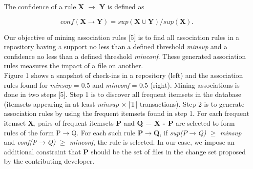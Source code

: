 The confidence of a rule \textbf{X} $\rightarrow$ \textbf{Y} is defined as 

\begin{equation}
conf(\textbf{X} \rightarrow \textbf{Y}) = \textit{sup}(\textbf{X}\cup\textbf{Y}) / \textit{sup}(\textbf{X}). 
\end{equation}

Our objective of mining association rules [5] is to find all association rules in a repository having a support no less than a defined threshold \textit{minsup} and a confidence no less
than a defined threshold \textit{minconf}. These generated association rules measures the impact of a file on another. \\

Figure 1 shows a snapshot of check-ins in a repository (left) and the association rules found for \textit{minsup} = 0.5 and \textit{minconf} = 0.5 (right). Mining associations is done in two steps [5]. Step 1 is to discover all frequent itemsets in the database (itemsets appearing in at least \textit{minsup} $\times$ |T| transactions). Step 2 is to generate association rules by using the frequent itemsets found in step 1. For each frequent itemset \textbf{X}, pairs of frequent itemsets \textbf{P} and \textbf{Q = X - P} are selected to form rules of the form P$\rightarrow$Q. For each such rule \textbf{P$\rightarrow$Q}, if \textit{sup(P$\rightarrow$Q) $\ge$ minsup} and \textit{conf(P$\rightarrow$Q) $\ge$ minconf}, the rule is selected. In our case, we impose an additional constraint that \textbf{P} should be the set of files in the change set proposed by the contributing developer.

